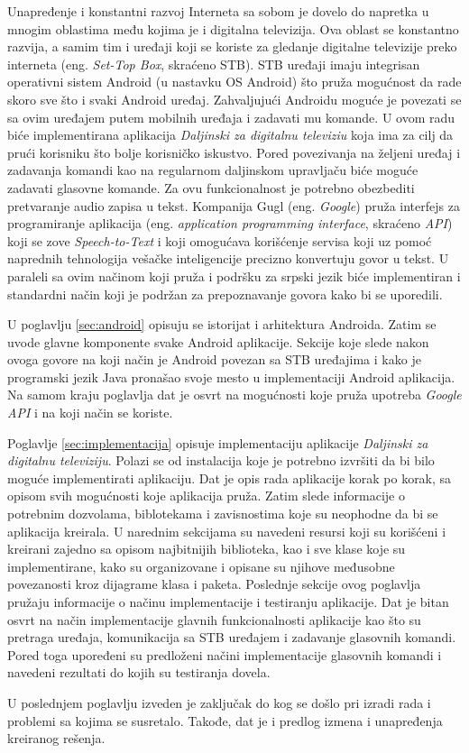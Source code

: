 \documentclass[TamaraIvanovicMasterRad.tex]{subfiles}
\begin{document}
Unapređenje i konstantni razvoj Interneta sa sobom je dovelo do napretka u mnogim oblastima među kojima je i digitalna televizija. Ova oblast se konstantno razvija, a samim tim i uređaji koji se koriste za gledanje digitalne televizije preko interneta (eng. \textit{Set-Top Box}, skraćeno STB). STB uređaji imaju integrisan operativni sistem Android (u nastavku OS Android) \cite{book:oreillycookbook} što pruža mogućnost da rade skoro sve što i svaki Android uređaj. Zahvaljujući Androidu moguće je povezati se sa ovim uređajem putem mobilnih uređaja i zadavati mu komande. U ovom radu biće implementirana aplikacija \textit{Daljinski za digitalnu televiziu} koja ima za cilj da prući korisniku što bolje korisničko iskustvo. Pored povezivanja na željeni uređaj i zadavanja komandi kao na regularnom daljinskom upravljaču biće moguće zadavati glasovne komande. Za ovu funkcionalnost je potrebno obezbediti pretvaranje audio zapisa u tekst. Kompanija Gugl (eng. \textit{Google}) pruža interfejs za programiranje aplikacija (eng. \textit{application programming interface}, skraćeno \textit{API}) \cite{sajt:googleCloudApis} koji se zove \textit{Speech-to-Text} \cite{sajt:googleSTT} i koji omogućava korišćenje servisa koji uz pomoć naprednih tehnologija vešačke inteligencije precizno konvertuju govor u tekst. U paraleli sa ovim načinom koji pruža i podršku za srpski jezik biće implementiran i standardni način koji je podržan za prepoznavanje govora kako bi se uporedili.

U poglavlju \ref{sec:android} opisuju se istorijat i arhitektura Androida. Zatim se uvode glavne komponente svake Android aplikacije. Sekcije koje slede nakon ovoga govore na koji način je Android povezan sa STB uređajima i kako je programski jezik Java pronašao svoje mesto u implementaciji Android aplikacija. Na samom kraju poglavlja dat je osvrt na mogućnosti koje pruža upotreba \textit{Google API} i na koji način se koriste.

Poglavlje \ref{sec:implementacija} opisuje implementaciju aplikacije \textit{Daljinski za digitalnu televiziju}. Polazi se od instalacija koje je potrebno izvršiti da bi bilo moguće implementirati aplikaciju. Dat je opis rada aplikacije korak po korak, sa opisom svih mogućnosti koje aplikacija pruža. Zatim slede informacije o potrebnim dozvolama, biblotekama i zavisnostima koje su neophodne da bi se aplikacija kreirala. U narednim sekcijama su navedeni resursi koji su korišćeni i kreirani zajedno sa opisom najbitnijih biblioteka, kao i sve klase koje su implementirane, kako su organizovane i opisane su njihove međusobne povezanosti kroz dijagrame klasa i paketa. Poslednje sekcije ovog poglavlja pružaju informacije o načinu implementacije i testiranju aplikacije. Dat je bitan osvrt na način implementacije glavnih funkcionalnosti aplikacije kao što su pretraga uređaja, komunikacija sa STB uređajem i zadavanje glasovnih komandi. Pored toga upoređeni su predloženi načini implementacije glasovnih komandi i navedeni rezultati do kojih su testiranja dovela.  

U poslednjem poglavlju izveden je zaključak do kog se došlo pri izradi rada i problemi sa kojima se susretalo. Takođe, dat je i predlog izmena i unapređenja kreiranog rešenja.
\end{document}

